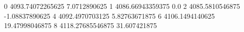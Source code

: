 0 4093.74072265625 7.0712890625
1 4086.66943359375 0.0
2 4085.5810546875 -1.08837890625
4 4092.4970703125 5.82763671875
6 4106.1494140625 19.47998046875
8 4118.27685546875 31.607421875
